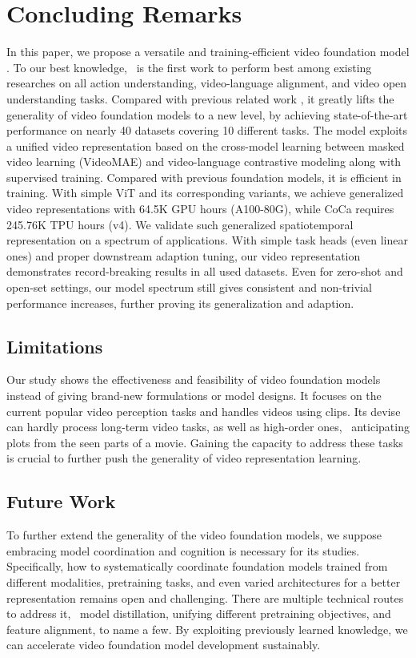 \section{Concluding Remarks}

In this paper, we propose a versatile and training-efficient video foundation model \model. To our best knowledge, \model~is the first work to perform best among existing researches on all action understanding, video-language alignment, and video open understanding tasks. Compared with previous related work \cite{maskfeat,mtv,merlot}, it greatly lifts the generality of video foundation models to a new level, by achieving state-of-the-art performance on nearly 40 datasets covering 10 different tasks. 
The model exploits a unified video representation based on the cross-model learning between masked video learning (VideoMAE) and video-language contrastive modeling along with supervised training. Compared with previous foundation models, it is efficient in training. With simple ViT and its corresponding variants, we achieve generalized video representations with 64.5K GPU hours (A100-80G), while CoCa \cite{coca} requires 245.76K TPU hours (v4). We validate such generalized spatiotemporal representation on a spectrum of applications. With simple task heads (even linear ones) and proper downstream adaption tuning, our video representation demonstrates record-breaking results in all used datasets. Even for zero-shot and open-set settings, our model spectrum still gives consistent and non-trivial performance increases, further proving its generalization and adaption.

\subsection{Limitations} 
Our study shows the effectiveness and feasibility of video foundation models instead of giving brand-new formulations or model designs. It focuses on the current popular video perception tasks and handles videos using clips. Its devise can hardly process long-term video tasks, as well as high-order ones, \eg~anticipating plots from the seen parts of a movie. Gaining the capacity to address these tasks is crucial to further push the generality of video representation learning.


\subsection{Future Work}
To further extend the generality of the video foundation models, we suppose embracing model coordination and cognition is necessary for its studies. Specifically, how to systematically coordinate foundation models trained from different modalities, pretraining tasks, and even varied architectures for a better representation remains open and challenging. There are multiple technical routes to address it, \eg\ model distillation, unifying different pretraining objectives, and feature alignment, to name a few. By exploiting previously learned knowledge, we can accelerate video foundation model development sustainably. 

